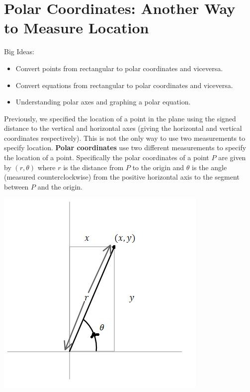 \section{Polar Coordinates: Another Way to Measure Location}
Big Ideas:
\begin{itemize}
\item Convert points from rectangular to polar coordinates and viceversa.
\item Convert equations from rectangular to polar coordinates and viceversa.
\item Understanding polar axes and graphing a polar equation.
\end{itemize}

\begin{info}
Previously, we specified the location of a point in the plane using the signed distance to the vertical and horizontal axes (giving the horizontal and vertical coordinates respectively). This is not the only way to use two measurements to specify location. \textbf{Polar coordinates} use two different measurements to specify the location of a point. Specifically the polar coordinates of a point $P$ are given by $(r,\theta)$ where $r$ is the distance from $P$ to the origin and $\theta$ is the angle (measured counterclockwise) from the positive horizontal axis to the segment between $P$ and the origin.

\begin{center} \includegraphics[scale=.75]{polarcoordinates.png} \end{center}
\end{info}


